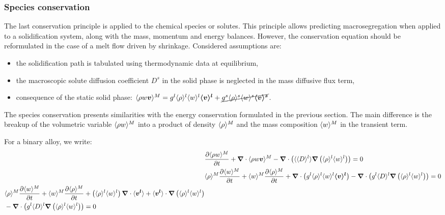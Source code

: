 \subsubsection{Species conservation}
The last conservation principle is applied to the chemical species or solutes. This principle allows predicting
macrosegregation when applied to a solidification system, along with the mass, momentum and energy balances.
However, the conservation equation should be reformulated in the case of a melt flow driven by shrinkage.
Considered assumptions are: 
\begin{itemize}
\itemsep0em
\item %
	  the solidification path is tabulated using thermodynamic data at equilibrium,
\item the macroscopic solute diffusion coefficient $D^s$ in the solid phase is neglected in the mass diffusive flux term,
\item consequence of the static solid phase: $\langle \rho w \boldsymbol{v} \rangle^M = {g^l} \langle \rho \rangle^l \langle w \rangle^l \boldsymbol{\langle v \rangle^l} +  \cancel{{g^s} \langle \rho \rangle^s \langle w \rangle^s \boldsymbol{\langle v \rangle^s}}$.
\end{itemize}

The species conservation presents similarities with the energy conservation formulated in the previous section. 
The main difference is the breakup of the volumetric variable $\langle \rho w \rangle^M$ into a product of 
density  $\langle \rho \rangle^M$ and the mass composition $\langle w \rangle^M$ in the transient term.

For a binary alloy, we write:
\begin{subequations}
\begin{align}
 & \tempup{\avg{\rho w}^M} + \nabvec \cdot \avg{\rho w \vec{v}}^M - \nabvec  \cdot \brac{\avg{\Dl} \nabvec \brac{\rhol \wl} } = 0 \\
 & \avg{\rho}^M \tempup{\avg{w}^M} + \avg{w}^M \tempup{\avg{\rho}^M} 
	+ \nabvec \cdot \brac{\gl \rhol \wl \vl} 
	- \nabvec \cdot \brac{\gl \Dl \nabvec \brac{\rhol \wl} } = 0 \\
 \label{eq:species_1}
  \begin{split}
	& \avg{\rho}^M \tempup{\avg{w}^M} + \avg{w}^M \tempup{\avg{\rho}^M} 
	+ \brac{\rhol \wl} \nabvec \cdot \vit + \vit \cdot \nabvec \brac{\rhol \wl} \\
	& - \nabvec \cdot \brac{\gl \Dl \nabvec \brac{\rhol \wl} } = 0 
  \end{split}
%
\end{align}
\end{subequations}

